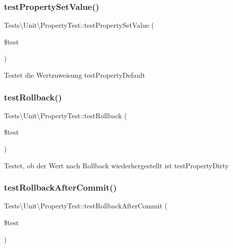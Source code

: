 \subsubsection{\texorpdfstring{test\+Property\+Set\+Value()}{testPropertySetValue()}}
{\footnotesize\ttfamily Tests\textbackslash{}\+Unit\textbackslash{}\+Property\+Test\+::test\+Property\+Set\+Value (\begin{DoxyParamCaption}\item[{}]{\$test }\end{DoxyParamCaption})}

Testet die Wertzuweisung  test\+Property\+Default \mbox{\label{classTests_1_1Unit_1_1PropertyTest_adf0275f2346bad9bd3a29b742123d7b2}} 
\subsubsection{\texorpdfstring{test\+Rollback()}{testRollback()}}
{\footnotesize\ttfamily Tests\textbackslash{}\+Unit\textbackslash{}\+Property\+Test\+::test\+Rollback (\begin{DoxyParamCaption}\item[{}]{\$test }\end{DoxyParamCaption})}

Testet, ob der Wert nach Rollback wiederhergestellt ist  test\+Property\+Dirty \mbox{\label{classTests_1_1Unit_1_1PropertyTest_abaf62c987484835ce25b2a6eaf406fc3}} 
\subsubsection{\texorpdfstring{test\+Rollback\+After\+Commit()}{testRollbackAfterCommit()}}
{\footnotesize\ttfamily Tests\textbackslash{}\+Unit\textbackslash{}\+Property\+Test\+::test\+Rollback\+After\+Commit (\begin{DoxyParamCaption}\item[{}]{\$test }\end{DoxyParamCaption})}

